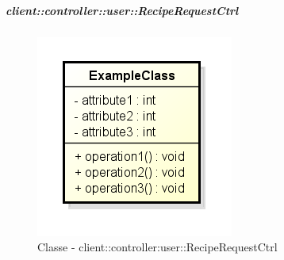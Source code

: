 		\subparagraph{client::controller::user::RecipeRequestCtrl} %
		\label{subp:client_controller_user_reciperequestctrl}
			\begin{figure}[htbp]
				\centering
				\centerline{\includegraphics[scale=0.7]{./images/client/classes/example_class.png}}
				\caption{Classe - client::controller:user::RecipeRequestCtrl}
			\end{figure}
